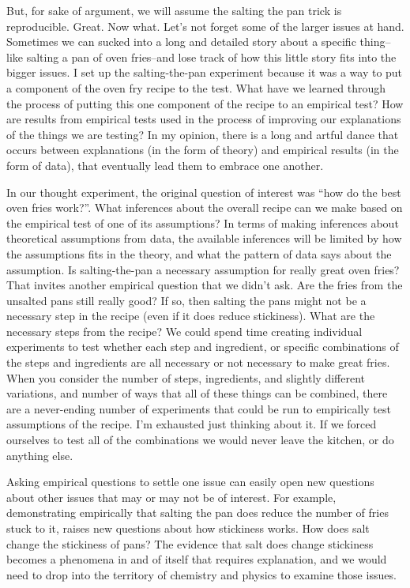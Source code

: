 \documentclass[
  oneside,
  12pt]{crumpbook}
\begin{document}
But, for sake of argument, we will assume the salting the pan trick is reproducible. Great. Now what. Let's not forget some of the larger issues at hand. Sometimes we can sucked into a long and detailed story about a specific thing-- like salting a pan of oven fries--and lose track of how this little story fits into the bigger issues. I set up the salting-the-pan experiment because it was a way to put a component of the oven fry recipe to the test. What have we learned through the process of putting this one component of the recipe to an empirical test? How are results from empirical tests used in the process of improving our explanations of the things we are testing? In my opinion, there is a long and artful dance that occurs between explanations (in the form of theory) and empirical results (in the form of data), that eventually lead them to embrace one another.

In our thought experiment, the original question of interest was ``how do the best oven fries work?''. What inferences about the overall recipe can we make based on the empirical test of one of its assumptions? In terms of making inferences about theoretical assumptions from data, the available inferences will be limited by how the assumptions fits in the theory, and what the pattern of data says about the assumption. Is salting-the-pan a necessary assumption for really great oven fries? That invites another empirical question that we didn't ask. Are the fries from the unsalted pans still really good? If so, then salting the pans might not be a necessary step in the recipe (even if it does reduce stickiness). What are the necessary steps from the recipe? We could spend time creating individual experiments to test whether each step and ingredient, or specific combinations of the steps and ingredients are all necessary or not necessary to make great fries. When you consider the number of steps, ingredients, and slightly different variations, and number of ways that all of these things can be combined, there are a never-ending number of experiments that could be run to empirically test assumptions of the recipe. I'm exhausted just thinking about it. If we forced ourselves to test all of the combinations we would never leave the kitchen, or do anything else.

Asking empirical questions to settle one issue can easily open new questions about other issues that may or may not be of interest. For example, demonstrating empirically that salting the pan does reduce the number of fries stuck to it, raises new questions about how stickiness works. How does salt change the stickiness of pans? The evidence that salt does change stickiness becomes a phenomena in and of itself that requires explanation, and we would need to drop into the territory of chemistry and physics to examine those issues.
\end{document}
